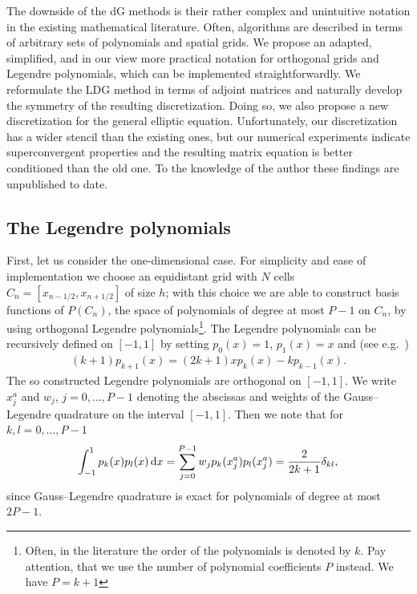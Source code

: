 The downside of the dG methods is their rather complex and unintuitive notation 
in the existing mathematical literature. Often, algorithms
are described in terms of arbitrary sets of polynomials and spatial grids. 
We propose an adapted, simplified, and in our view more practical notation for orthogonal grids and Legendre polynomials, which can be implemented straightforwardly.
We reformulate the LDG method in terms of adjoint matrices and
 naturally develop the symmetry of the resulting discretization.
Doing so, we also propose a new discretization for the general elliptic equation. 
Unfortunately, our discretization has a wider stencil than the existing ones, but 
our numerical experiments indicate superconvergent properties and the resulting
matrix equation is better conditioned than the old one. To the knowledge
of the author these findings are unpublished to date.

\subsection{ The Legendre polynomials} \label{sec:legendre}
First, let us consider the one-dimensional case.
For simplicity and ease of implementation we choose an equidistant grid with $N$ cells $C_n = [x_{n-1/2},x_{n+1/2}]$ of size $h$;
with this choice we are able to construct basis functions of $P(C_n)$, the space of 
polynomials of degree at most $P-1$ on $C_n$, by using orthogonal Legendre polynomials\footnote{ Often, in the literature the order of the polynomials is denoted by $k$.
Pay attention, that we use the number of polynomial coefficients $P$ instead. We have $P=k+1$}.
The Legendre polynomials can be recursively defined on $[-1,1]$ by setting
$p_0(x) = 1$, $p_1(x) = x$ and (see e.g.~\cite{AS})
\begin{align}
    (k+1)p_{k+1}(x) = (2k+1)xp_k(x) - kp_{k-1}(x).
    \label{eq:recursion}
\end{align}
The so constructed Legendre polynomials are orthogonal on $[-1,1]$.
We write
$x^a_j$ and $w_j$, $j=0,\dots,P-1$ denoting the abscissas and weights of
the Gauss--Legendre quadrature on the interval $[-1,1]$. Then we note that for $k,l=0, \dots, P-1$
\begin{align}
    \int_{-1}^1 p_k(x)p_l(x) \,\mathrm{d}x = \sum_{j=0}^{P-1} w_jp_k (x^a_j)p_l(x^a_j) = \frac{2}{2k+1}\delta_{kl}, 
    \label{}
\end{align}
 since Gauss--Legendre quadrature is exact for polynomials of degree at most $2P-1$.


